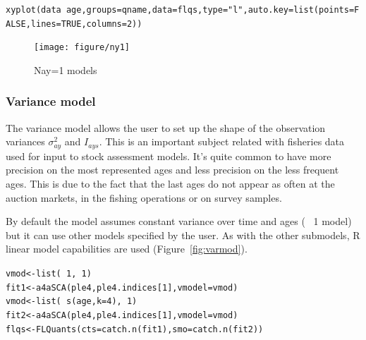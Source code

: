 \documentclass[a4paper,english,10pt]{article}\usepackage[]{graphicx}\usepackage[]{color}
\makeatletter
\newcommand{\hlnum}[1]{\textcolor[rgb]{0.2,0.2,0.2}{#1}}%
\newcommand{\hlstr}[1]{\textcolor[rgb]{0.2,0.2,0.2}{#1}}%
\newcommand{\hlopt}[1]{\textcolor[rgb]{0.2,0.2,0.2}{#1}}%
\newcommand{\hlstd}[1]{\textcolor[rgb]{0,0,0}{#1}}%
\newcommand{\hlkwb}[1]{\textcolor[rgb]{0.361,0.506,0.596}{#1}}%
\newcommand{\hlkwc}[1]{\textcolor[rgb]{0.361,0.506,0.596}{#1}}%
\newcommand{\hlkwd}[1]{\textcolor[rgb]{0.361,0.506,0.596}{#1}}%
\newenvironment{kframe}{%
 \def\at@end@of@kframe{}%
 \ifinner\ifhmode%
  \def\at@end@of@kframe{\end{minipage}}%
  \begin{minipage}{\columnwidth}%
 \fi\fi%
 \def\FrameCommand##1{\hskip\@totalleftmargin \hskip-\fboxsep
 \colorbox{shadecolor}{##1}\hskip-\fboxsep
     \hskip-\linewidth \hskip-\@totalleftmargin \hskip\columnwidth}%
 \MakeFramed {\advance\hsize-\width
   \@totalleftmargin\z@ \linewidth\hsize
   \@setminipage}}%
 {\par\unskip\endMakeFramed%
 \at@end@of@kframe}
\newenvironment{knitrout}{}{} %
\makeatother
\begin{document}
\begin{knitrout}
\color{fgcolor}\begin{kframe}
\begin{alltt}
\hlkwd{xyplot}\hlstd{(data}\hlopt{~}\hlstd{age,} \hlkwc{groups}\hlstd{=qname,} \hlkwc{data}\hlstd{=flqs,} \hlkwc{type}\hlstd{=}\hlstr{"l"}\hlstd{,} \hlkwc{auto.key}\hlstd{=}\hlkwd{list}\hlstd{(}\hlkwc{points}\hlstd{=}\hlnum{FALSE}\hlstd{,} \hlkwc{lines}\hlstd{=}\hlnum{TRUE}\hlstd{,} \hlkwc{columns}\hlstd{=}\hlnum{2}\hlstd{))}
\end{alltt}
\end{kframe}\begin{figure}[H]


{\centering \texttt{[image: figure/ny1]} 

}

\caption[Nay=1 models]{Nay=1 models\label{fig:ny1}}
\end{figure}


\end{knitrout}

\subsubsection{Variance model}

The variance model allows the user to set up the shape of the observation variances $\sigma^2_{ay}$ and $I_{ays}$. This is an important subject related with fisheries data used for input to stock assessment models. It's quite common to have more precision on the most represented ages and less precision on the less frequent ages. This is due to the fact that the last ages do not appear as often at the auction markets, in the fishing operations or on survey samples.

By default the model assumes constant variance over time and ages (~ 1 model) but it can use other models specified by the user. As with the other submodels, R linear model capabilities are used (Figure~\ref{fig:varmod}).

\begin{knitrout}
\color{fgcolor}\begin{kframe}
\begin{alltt}
\hlstd{vmod} \hlkwb{<-} \hlkwd{list}\hlstd{(}\hlopt{~}\hlnum{1}\hlstd{,} \hlopt{~}\hlnum{1}\hlstd{)}
\hlstd{fit1} \hlkwb{<-} \hlkwd{a4aSCA}\hlstd{(ple4, ple4.indices[}\hlnum{1}\hlstd{],} \hlkwc{vmodel}\hlstd{=vmod)}
\hlstd{vmod} \hlkwb{<-} \hlkwd{list}\hlstd{(}\hlopt{~} \hlkwd{s}\hlstd{(age,} \hlkwc{k}\hlstd{=}\hlnum{4}\hlstd{),} \hlopt{~}\hlnum{1}\hlstd{)}
\hlstd{fit2} \hlkwb{<-} \hlkwd{a4aSCA}\hlstd{(ple4, ple4.indices[}\hlnum{1}\hlstd{],} \hlkwc{vmodel}\hlstd{=vmod)}
\hlstd{flqs} \hlkwb{<-} \hlkwd{FLQuants}\hlstd{(}\hlkwc{cts}\hlstd{=}\hlkwd{catch.n}\hlstd{(fit1),} \hlkwc{smo}\hlstd{=}\hlkwd{catch.n}\hlstd{(fit2))}
\end{alltt}
\end{kframe}
\end{knitrout}
\end{document}
